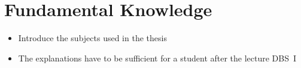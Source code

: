 \chapter{Fundamental Knowledge}
\begin{itemize}
  \item Introduce the subjects used in the thesis
  \item The explanations have to be sufficient for a student after the lecture DBS~I
\end{itemize}



